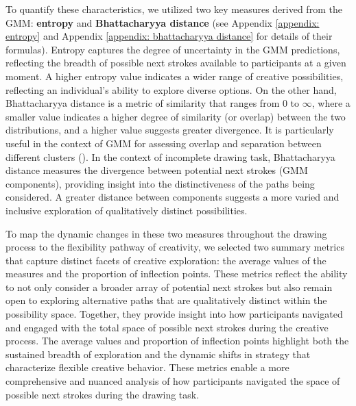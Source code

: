 \documentclass[../MA_Thesis.tex]{subfiles}
\begin{document}
To quantify these characteristics, we utilized two key measures derived from the GMM: \textbf{entropy} and \textbf{Bhattacharyya distance} (see Appendix \ref{appendix: entropy} and Appendix \ref{appendix: bhattacharyya distance} for details of their formulas). Entropy captures the degree of uncertainty in the GMM predictions, reflecting the breadth of possible next strokes available to participants at a given moment. A higher entropy value indicates a wider range of creative possibilities, reflecting an individual's ability to explore diverse options. On the other hand, Bhattacharyya distance is a metric of similarity that ranges from 0 to $\infty$, where a smaller value indicates a higher degree of similarity (or overlap) between the two distributions, and a higher value suggests greater divergence. It is particularly useful in the context of GMM for assessing overlap and separation between different clusters (\cite{alangari_intrinsically_2023}). In the context of incomplete drawing task, Bhattacharyya distance measures the divergence between potential next strokes (GMM components), providing insight into the distinctiveness of the paths being considered. A greater distance between components suggests a more varied and inclusive exploration of qualitatively distinct possibilities.

To map the dynamic changes in these two measures throughout the drawing process to the flexibility pathway of creativity, we selected two summary metrics that capture distinct facets of creative exploration: the average values of the measures and the proportion of inflection points. These metrics reflect the ability to not only consider a broader array of potential next strokes but also remain open to exploring alternative paths that are qualitatively distinct within the possibility space. Together, they provide insight into how participants navigated and engaged with the total space of possible next strokes during the creative process. The average values and proportion of inflection points highlight both the sustained breadth of exploration and the dynamic shifts in strategy that characterize flexible creative behavior. These metrics enable a more comprehensive and nuanced analysis of how participants navigated the space of possible next strokes during the drawing task.
\end{document}
